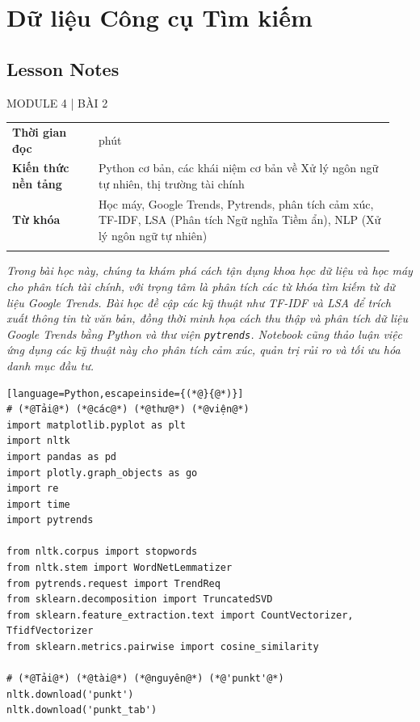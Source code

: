 \chapter{Dữ liệu Công cụ Tìm kiếm}
\label{ch:M4L2}


\section*{Lesson Notes}

MODULE 4 | BÀI 2

{\small
\begin{longtable}{>{\raggedright\arraybackslash}p{0.213\linewidth}>{\raggedright\arraybackslash}p{0.727\linewidth}}
\toprule
\textbf{Thời gian đọc} & 60 phút \\
\addlinespace[2pt]
\textbf{Kiến thức nền tảng} & Python cơ bản, các khái niệm cơ bản về Xử lý ngôn ngữ tự nhiên, thị trường tài chính \\
\addlinespace[2pt]
\textbf{Từ khóa} & Học máy, Google Trends, Pytrends, phân tích cảm xúc, TF-IDF, LSA (Phân tích Ngữ nghĩa Tiềm ẩn), NLP (Xử lý ngôn ngữ tự nhiên) \\
\addlinespace[2pt]
\bottomrule
\end{longtable}
}

\emph{Trong bài học này, chúng ta khám phá cách tận dụng khoa học dữ liệu và học máy cho phân tích tài chính, với trọng tâm là phân tích các từ khóa tìm kiếm từ dữ liệu Google Trends. Bài học đề cập các kỹ thuật như TF-IDF và LSA để trích xuất thông tin từ văn bản, đồng thời minh họa cách thu thập và phân tích dữ liệu Google Trends bằng Python và thư viện \texttt{pytrends}. Notebook cũng thảo luận việc ứng dụng các kỹ thuật này cho phân tích cảm xúc, quản trị rủi ro và tối ưu hóa danh mục đầu tư.}

\begin{lstlisting}[language=Python,escapeinside={(*@}{@*)}]
# (*@Tải@*) (*@các@*) (*@thư@*) (*@viện@*)
import matplotlib.pyplot as plt
import nltk
import pandas as pd
import plotly.graph_objects as go
import re
import time
import pytrends

from nltk.corpus import stopwords
from nltk.stem import WordNetLemmatizer
from pytrends.request import TrendReq
from sklearn.decomposition import TruncatedSVD
from sklearn.feature_extraction.text import CountVectorizer, TfidfVectorizer
from sklearn.metrics.pairwise import cosine_similarity

# (*@Tải@*) (*@tài@*) (*@nguyên@*) (*@'punkt'@*)
nltk.download('punkt')
nltk.download('punkt_tab')
\end{lstlisting}

